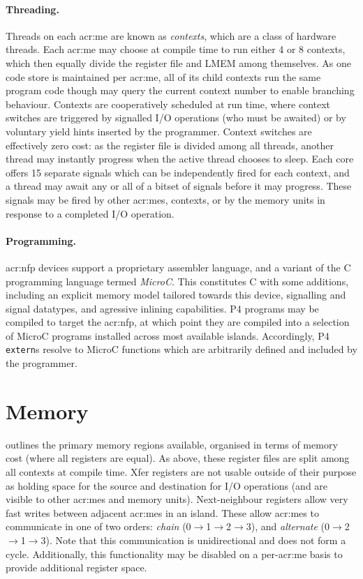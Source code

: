 \paragraph{Threading.}
Threads on each \gls{acr:me} are known as \emph{contexts}, which are a class of hardware threads.
Each \gls{acr:me} may choose at compile time to run either 4 or 8 contexts, which then equally divide the register file and LMEM among themselves.
As one code store is maintained per \gls{acr:me}, all of its child contexts run the same program code though may query the current context number to enable branching behaviour.
Contexts are cooperatively scheduled at run time, where context switches are triggered by signalled I/O operations (who must be awaited) or by voluntary yield hints inserted by the programmer.
Context switches are effectively zero cost: as the register file is divided among all threads, another thread may instantly progress when the active thread chooses to sleep.
Each core offers \num{15} separate signals which can be independently fired for each context, and a thread may await any or all of a bitset of signals before it may progress.
These signals may be fired by other \glspl{acr:me}, contexts, or by the memory units in response to a completed I/O operation.

\paragraph{Programming.}
\gls{acr:nfp} devices support a proprietary assembler language, and a variant of the C programming language termed \emph{MicroC}.
This constitutes C with some additions, including an explicit memory model tailored towards this device, signalling and signal datatypes, and agressive inlining capabilities.
P4 programs may be compiled to target the \gls{acr:nfp}, at which point they are compiled into a selection of MicroC programs installed across most available islands.
Accordingly, P4 \texttt{extern}s resolve to MicroC functions which are arbitrarily defined and included by the programmer.

\section{Memory}
 outlines the primary memory regions available, organised in terms of memory cost (where all registers are equal).
As above, these register files are split among all contexts at compile time.
Xfer registers are not usable outside of their purpose as holding space for the source and destination for I/O operations (and are visible to other \glspl{acr:me} and memory units).
Next-neighbour registers allow very fast writes between adjacent \glspl{acr:me} in an island.
These allow \glspl{acr:me} to communicate in one of two orders: \emph{chain} (0$\rightarrow$1$\rightarrow$2$\rightarrow$3), and \emph{alternate} (0$\rightarrow$2$\rightarrow$1$\rightarrow$3).
Note that this communication is unidirectional and does not form a cycle.
Additionally, this functionality may be disabled on a per-\gls{acr:me} basis to provide additional register space.

